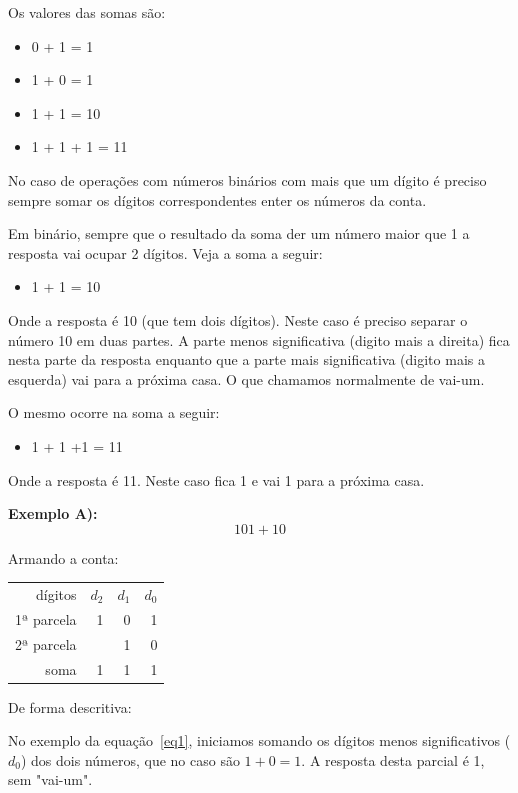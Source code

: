Os valores das somas são:
\begin{itemize}
	\item 0 + 1 = 1
	\item 1 + 0 = 1
	\item 1 + 1 = 10
	\item 1 + 1 + 1 = 11
\end{itemize}

No caso de operações com números binários com mais que um dígito é preciso sempre somar os dígitos correspondentes enter os números da conta.

Em binário, sempre que o resultado da soma der um número maior que 1 a resposta vai ocupar 2 dígitos. Veja a soma a seguir:
\begin{itemize}
	\item 1 + 1 = 10
\end{itemize}
Onde a resposta é 10 (que tem dois dígitos). Neste caso é preciso separar o número 10 em duas partes. 
A parte menos significativa (digito mais a direita) fica nesta parte da resposta enquanto que a parte mais significativa (digito mais a esquerda) vai para a próxima casa. O que chamamos normalmente de vai-um.

O mesmo ocorre na soma a seguir:
\begin{itemize}
	\item 1 + 1 +1 = 11
\end{itemize}
Onde a resposta é 11. Neste caso fica 1 e vai 1 para a próxima casa.


\textbf{Exemplo A):}
\begin{equation}\label{eq1}
101 + 10
\end{equation}

Armando a conta:
\begin{table}[h]
\centering
	\begin{tabular}{r|rrr}
		 	dígitos	& $d_2$ & $d_1$ & $d_0$ \\
		1ª parcela  & 1 & 0 & 1 \\
		2ª parcela  &   & 1 & 0 \\
		\hline
		   soma	  & 1 & 1 & 1 \\
	\end{tabular}
\end{table}

De forma descritiva:

No exemplo da equação~\ref{eq1}, iniciamos somando os dígitos menos significativos ($d_0$) dos dois números, que no caso são $ 1 + 0 = 1$. A resposta desta parcial é 1, sem "vai-um".

